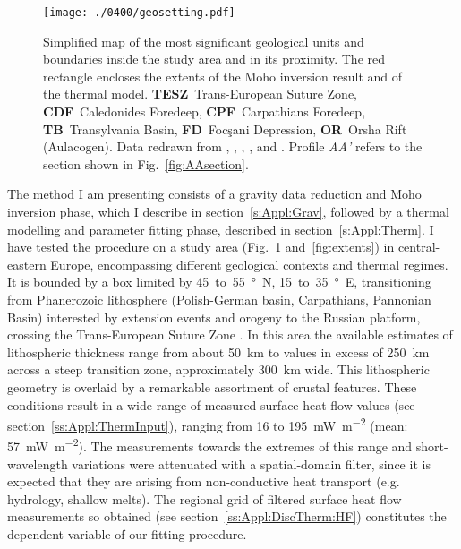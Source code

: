 \begin{figure}
    \begin{adjustbox}{center}
        \texttt{[image: ./0400/geosetting.pdf]}
    \end{adjustbox}
	\caption[Simplified map of the most significant geological units and boundaries inside the study area and in its proximity.]{Simplified map of the most significant geological units and boundaries inside the study area and in its proximity. The red rectangle encloses the extents of the Moho inversion result and of the thermal model. \textbf{TESZ}~Trans-European Suture Zone, \textbf{CDF}~Caledonides Foredeep, \textbf{CPF}~Carpathians Foredeep, \textbf{TB}~Transylvania Basin, \textbf{FD}~Focşani Depression, \textbf{OR}~Orsha Rift (Aulacogen). Data redrawn from \textcite{Tarapoanca2003}, \textcite{Tesauro2008}, \textcite{Artemieva2013}, \textcite{Mazur2016}, and \textcite{Starostenko2018}. Profile \textit{AA'} refers to the section shown in Fig.~\ref{fig:AAsection}.}
    \label{fig:geosetting}
\end{figure}

The method I am presenting consists of a gravity data reduction and Moho inversion phase, which I describe in section~\ref{s:Appl:Grav}, followed by a thermal modelling and parameter fitting phase, described in section~\ref{s:Appl:Therm}.
I have tested the procedure on a study area (Fig.~\ref{fig:geosetting} and~\ref{fig:extents}) in central-eastern Europe, encompassing different geological contexts and thermal regimes.
It is bounded by a box limited by \num{45}~to~\SI{55}{\degree N}, \num{15}~to~\SI{35}{\degree E}, transitioning from Phanerozoic lithosphere (Polish-German basin, Carpathians, Pannonian Basin) interested by extension events and orogeny to the Russian platform, crossing the Trans-European Suture Zone \parencite[TESZ,][]{Jones2010}.
In this area the available estimates of lithospheric thickness range from about 50~\si{\kilo \metre} to values in excess of 250~\si{\kilo \metre} across a steep transition zone, approximately 300~\si{\kilo \metre} wide.
This lithospheric geometry is overlaid by a remarkable assortment of crustal features.
These conditions result in a wide range of measured surface heat flow values (see section~\ref{ss:Appl:ThermInput}), ranging from 16 to 195~\si{\milli \watt \per \square \metre} (mean: 57~\si{\milli \watt \per \square \metre}).
The measurements towards the extremes of this range and short-wavelength variations were attenuated with a spatial-domain filter, since it is expected that they are arising from non-conductive heat transport (e.g. hydrology, shallow melts).
The regional grid of filtered surface heat flow measurements so obtained (see section~\ref{ss:Appl:DiscTherm:HF}) constitutes the dependent variable of our fitting procedure.

